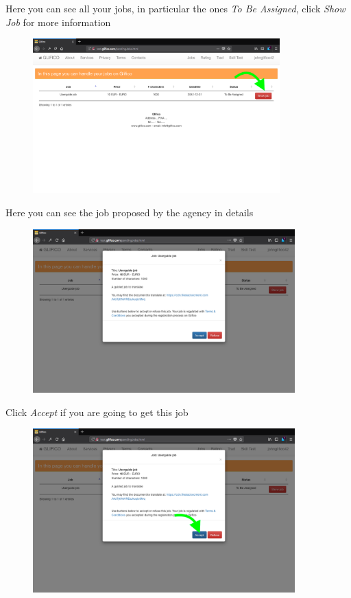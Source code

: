 \documentclass[11 pt, a4paper]{article}
\begin{document}
Here you can see all your jobs, in particular the ones \textit{To Be Assigned}, click \textit{Show Job} for more information
\begin{figure}[H]
\centering
\includegraphics[width=0.85\textwidth]{translator_job1.png}
\end{figure}


\clearpage
Here you can see the job proposed by the agency in details
\begin{figure}[H]
\centering
\includegraphics[width=0.9\textwidth]{translator_job2.png}
\end{figure}

Click \textit{Accept} if you are going to get this job
\begin{figure}[H]
\centering
\includegraphics[width=0.9\textwidth]{translator_job3.png}
\end{figure}
\end{document}
